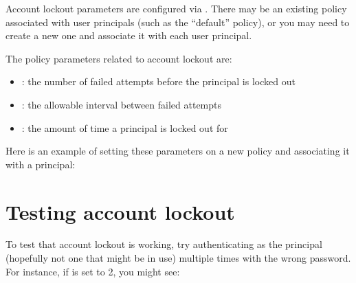 \documentclass[letterpaper,10pt,english]{sphinxmanual}
\begin{document}
\sphinxAtStartPar
Account lockout parameters are configured via {\hyperref[\detokenize{admin/database:policies}]{}}.  There may be an existing policy associated with user
principals (such as the “default” policy), or you may need to create a
new one and associate it with each user principal.

\sphinxAtStartPar
The policy parameters related to account lockout are:
\begin{itemize}
\item {} 
\sphinxAtStartPar
{\hyperref[\detokenize{admin/admin_commands/kadmin_local:policy-maxfailure}]{}}: the number of failed attempts
before the principal is locked out

\item {} 
\sphinxAtStartPar
{\hyperref[\detokenize{admin/admin_commands/kadmin_local:policy-failurecountinterval}]{}}: the
allowable interval between failed attempts

\item {} 
\sphinxAtStartPar
{\hyperref[\detokenize{admin/admin_commands/kadmin_local:policy-lockoutduration}]{}}: the amount of time
a principal is locked out for

\end{itemize}

\sphinxAtStartPar
Here is an example of setting these parameters on a new policy and
associating it with a principal:

\begin{sphinxVerbatim}[commandchars=\\\{\}]
     
      
    
\end{sphinxVerbatim}


\section{Testing account lockout}
\label{\detokenize{admin/lockout:testing-account-lockout}}
\sphinxAtStartPar
To test that account lockout is working, try authenticating as the
principal (hopefully not one that might be in use) multiple times with
the wrong password.  For instance, if  is set to 2, you
might see:
\end{document}
